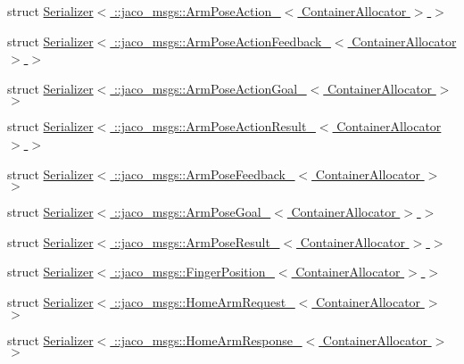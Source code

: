 \begin{DoxyCompactItemize}
\item 
struct \hyperlink{structros_1_1serialization_1_1Serializer_3_01_1_1jaco__msgs_1_1ArmPoseAction___3_01ContainerAllocator_01_4_01_4}{Serializer$<$ \+::jaco\+\_\+msgs\+::\+Arm\+Pose\+Action\+\_\+$<$ Container\+Allocator $>$ $>$}
\item 
struct \hyperlink{structros_1_1serialization_1_1Serializer_3_01_1_1jaco__msgs_1_1ArmPoseActionFeedback___3_01ContainerAllocator_01_4_01_4}{Serializer$<$ \+::jaco\+\_\+msgs\+::\+Arm\+Pose\+Action\+Feedback\+\_\+$<$ Container\+Allocator $>$ $>$}
\item 
struct \hyperlink{structros_1_1serialization_1_1Serializer_3_01_1_1jaco__msgs_1_1ArmPoseActionGoal___3_01ContainerAllocator_01_4_01_4}{Serializer$<$ \+::jaco\+\_\+msgs\+::\+Arm\+Pose\+Action\+Goal\+\_\+$<$ Container\+Allocator $>$ $>$}
\item 
struct \hyperlink{structros_1_1serialization_1_1Serializer_3_01_1_1jaco__msgs_1_1ArmPoseActionResult___3_01ContainerAllocator_01_4_01_4}{Serializer$<$ \+::jaco\+\_\+msgs\+::\+Arm\+Pose\+Action\+Result\+\_\+$<$ Container\+Allocator $>$ $>$}
\item 
struct \hyperlink{structros_1_1serialization_1_1Serializer_3_01_1_1jaco__msgs_1_1ArmPoseFeedback___3_01ContainerAllocator_01_4_01_4}{Serializer$<$ \+::jaco\+\_\+msgs\+::\+Arm\+Pose\+Feedback\+\_\+$<$ Container\+Allocator $>$ $>$}
\item 
struct \hyperlink{structros_1_1serialization_1_1Serializer_3_01_1_1jaco__msgs_1_1ArmPoseGoal___3_01ContainerAllocator_01_4_01_4}{Serializer$<$ \+::jaco\+\_\+msgs\+::\+Arm\+Pose\+Goal\+\_\+$<$ Container\+Allocator $>$ $>$}
\item 
struct \hyperlink{structros_1_1serialization_1_1Serializer_3_01_1_1jaco__msgs_1_1ArmPoseResult___3_01ContainerAllocator_01_4_01_4}{Serializer$<$ \+::jaco\+\_\+msgs\+::\+Arm\+Pose\+Result\+\_\+$<$ Container\+Allocator $>$ $>$}
\item 
struct \hyperlink{structros_1_1serialization_1_1Serializer_3_01_1_1jaco__msgs_1_1FingerPosition___3_01ContainerAllocator_01_4_01_4}{Serializer$<$ \+::jaco\+\_\+msgs\+::\+Finger\+Position\+\_\+$<$ Container\+Allocator $>$ $>$}
\item 
struct \hyperlink{structros_1_1serialization_1_1Serializer_3_01_1_1jaco__msgs_1_1HomeArmRequest___3_01ContainerAllocator_01_4_01_4}{Serializer$<$ \+::jaco\+\_\+msgs\+::\+Home\+Arm\+Request\+\_\+$<$ Container\+Allocator $>$ $>$}
\item 
struct \hyperlink{structros_1_1serialization_1_1Serializer_3_01_1_1jaco__msgs_1_1HomeArmResponse___3_01ContainerAllocator_01_4_01_4}{Serializer$<$ \+::jaco\+\_\+msgs\+::\+Home\+Arm\+Response\+\_\+$<$ Container\+Allocator $>$ $>$}

\end{DoxyCompactItemize}

